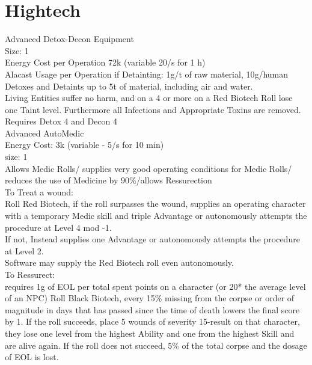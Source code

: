 \section{Hightech}\label{sec:hightech}
Advanced Detox-Decon Equipment \\
Size: 1\\
Energy Cost per Operation 72k (variable 20/s for 1 h)\\
Alacast Usage per Operation if Detainting: 1g/t of raw material, 10g/human\\
Detoxes and Detaints up to 5t of material, including air and water.\\
Living Entities suffer no harm, and on a 4 or more on a Red Biotech Roll lose one Taint level.
Furthermore all Infections and Appropriate Toxins are removed.\\
Requires Detox 4 and Decon 4\\
\newline
Advanced AutoMedic\\
Energy Cost: 3k (variable - 5/s for 10 min)\\
size: 1\\
Allows Medic Rolls/ supplies very good operating conditions for Medic Rolls/ reduces the use of Medicine by 90\%/allows Ressurection\\
To Treat a wound:\\
Roll Red Biotech, if the roll surpasses the wound, supplies an operating character with a temporary Medic skill and
triple Advantage or autonomously attempts the procedure at Level 4 mod -1.\\
If not, Instead supplies one Advantage or autonomously attempts the procedure at Level 2.\\
Software may supply the Red Biotech roll even autonomously.\\
To Ressurect:\\
requires 1g of EOL per total spent points on a character (or 20* the average level of an NPC)
Roll Black Biotech, every 15\% missing from the corpse or order of magnitude in days that has passed since the time of death
lowers the final score by 1.
If the roll succeeds, place 5 wounds of severity 15-result on that character, they lose
one level from the highest Ability and one from the highest Skill and are alive again.
If the roll does not succeed,
5\% of the total corpse and the dosage of EOL is lost.

